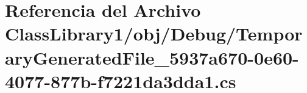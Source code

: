 \hypertarget{_class_library1_2obj_2_debug_2_temporary_generated_file__5937a670-0e60-4077-877b-f7221da3dda1_8cs}{}\section{Referencia del Archivo Class\+Library1/obj/\+Debug/\+Temporary\+Generated\+File\+\_\+5937a670-\/0e60-\/4077-\/877b-\/f7221da3dda1.cs}
\label{_class_library1_2obj_2_debug_2_temporary_generated_file__5937a670-0e60-4077-877b-f7221da3dda1_8cs}
